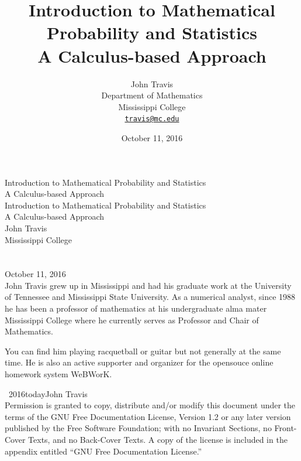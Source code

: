 \documentclass[10pt,]{book}
\title{Introduction to Mathematical Probability and Statistics\\
{\large A Calculus-based Approach}}
\author{John Travis\\
Department of Mathematics\\
Mississippi College\\
\href{mailto:travis@mc.edu}{\nolinkurl{travis@mc.edu}}
}
\date{October 11, 2016}
\theoremstyle{plain}
\theoremstyle{definition}
\theoremstyle{definition}
\theoremstyle{definition}
\numberwithin{equation}{section}
\begin{document}
\frontmatter
\thispagestyle{empty}
{\centering
\vspace*{0.28\textheight}
{\Huge Introduction to Mathematical Probability and Statistics}\\[2\baselineskip]
{\LARGE A Calculus-based Approach}\\
}
\clearpage
\thispagestyle{empty}
\null%
\clearpage
\thispagestyle{empty}
{\centering
\vspace*{0.14\textheight}
{\Huge Introduction to Mathematical Probability and Statistics}\\[\baselineskip]
{\LARGE A Calculus-based Approach}\\[3\baselineskip]
{\Large John Travis}\\[0.5\baselineskip]
{\Large Mississippi College}\\[3\baselineskip]
{\Large }\\[0.5\baselineskip]
{\normalsize }\\[3\baselineskip]
{\Large October 11, 2016}\\}
\clearpage
\thispagestyle{empty}
\noindent
John Travis grew up in Mississippi and had his graduate work at the University of Tennessee and Mississippi State University. As a numerical analyst, since 1988 he has been a professor of mathematics at his undergraduate alma mater Mississippi College where he currently serves as Professor and Chair of Mathematics.%
\par
You can find him playing racquetball or guitar but not generally at the same time. He is also an active supporter and organizer for the opensouce online homework system WeBWorK.%
\par
{}
\noindent\textcopyright\ 2016\textendash{}today\quad{}John Travis\\[0.5\baselineskip]
Permission is granted to copy, distribute and/or modify this document under the terms of the GNU Free Documentation License, Version 1.2 or any later version published by the Free Software Foundation; with no Invariant Sections, no Front-Cover Texts, and no Back-Cover Texts.  A copy of the license is included in the appendix entitled ``GNU Free Documentation License.''\par\medskip
{}
\null\clearpage
\end{document}

